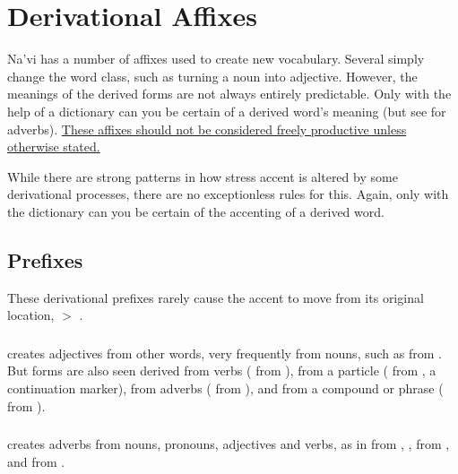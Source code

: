 
\section{Derivational Affixes}\label{lingop:affixes}
\noindent Na'vi has a number of affixes used to create new vocabulary.
Several simply change the word class, such as turning a noun into
adjective.  However, the meanings of the derived forms are not always
entirely predictable.  Only with the help of a dictionary can you be
certain of a derived word's meaning (but see  for
adverbs).  \uline{These affixes should not be considered freely
productive unless otherwise stated.}

While there are strong patterns in how stress accent is
altered by some derivational processes, there are no exceptionless
rules for this.  Again, only with the dictionary can you be certain of
the accenting of a derived word.


\subsection{Prefixes} These derivational prefixes rarely cause the
accent to move from its original location,  
$>$  . 

\subsubsection{}  creates adjectives from other words, very
frequently from nouns, such as  
from  .  But forms are also seen derived from
verbs (  from  ), from a particle (  from , a
continuation marker), from adverbs ( 
from  ), and from a compound or phrase
( 
from    ).

\subsubsection{}  creates adverbs from nouns, pronouns,
adjectives and verbs, as in   from
,  ,   from
 , and   from 
. 

